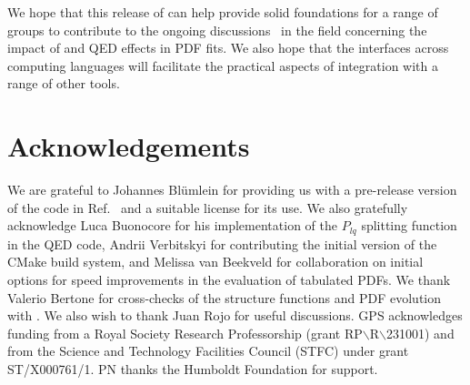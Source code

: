 \documentclass[preprint,1p,a4paper,11pt]{elsarticle}
\begin{document}
We hope that this release of \hoppet can help provide solid
foundations for a range of groups to contribute to the ongoing
discussions~\cite{McGowan:2022nag,NNPDF:2024nan,Cooper-Sarkar:2024crx,Cridge:2024icl,Cooper-Sarkar:2025sqw}
in the field concerning the impact of \ntlo and QED effects in PDF
fits.
%
We also hope that the interfaces across computing languages will
facilitate the practical aspects of integration with a range of other
tools.


\section*{Acknowledgements}

We are grateful to Johannes Bl\"umlein for providing us with a
pre-release version of the code in Ref.~\cite{BlumleinCode} and a
suitable license for its use.
%
We also gratefully acknowledge Luca Buonocore for his implementation
of the $P_{lq}$ splitting function in the QED code, Andrii Verbitskyi
for contributing the initial version of the CMake build system,
%
and Melissa van Beekveld for collaboration on initial options for speed
improvements in the evaluation of tabulated PDFs.
%
We thank Valerio Bertone for cross-checks of the  structure
functions and PDF evolution with \APFELPP.
%
We also wish to thank Juan Rojo for useful discussions. 
%
GPS acknowledges funding from a Royal Society Research
Professorship (grant RP$\backslash$R$\backslash$231001) and from the Science and
Technology Facilities Council (STFC) under grant ST/X000761/1.
%
PN thanks the Humboldt Foundation for support. 
%
\appendix





%
\end{document}

